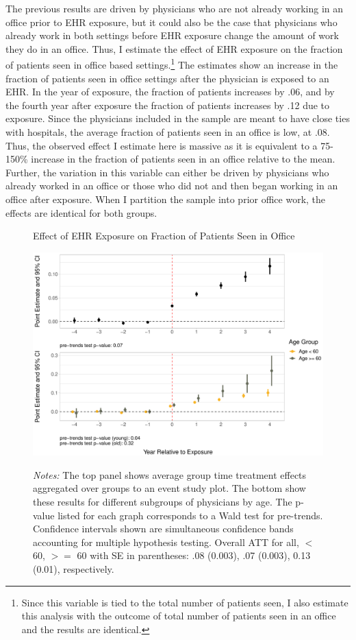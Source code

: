 \documentclass[12pt]{article}
\begin{document}
The previous results are driven by physicians who are not already working in an office prior to EHR exposure, but it could also be the case that physicians who already work in both settings before EHR exposure change the amount of work they do in an office. Thus, I estimate the effect of EHR exposure on the fraction of patients seen in office based settings.\footnote{Since this variable is tied to the total number of patients seen, I also estimate this analysis with the outcome of total number of patients seen in an office and the results are identical.} The estimates show an increase in the fraction of patients seen in office settings after the physician is exposed to an EHR. In the year of exposure, the fraction of patients increases by .06, and by the fourth year after exposure the fraction of patients increases by .12 due to exposure. Since the physicians included in the sample are meant to have close ties with hospitals, the average fraction of patients seen in an office is low, at .08. Thus, the observed effect I estimate here is massive as it is equivalent to a 75-150\% increase in the fraction of patients seen in an office relative to the mean. Further, the variation in this variable can either be driven by physicians who already worked in an office or those who did not and then began working in an office after exposure. When I partition the sample into prior office work, the effects are identical for both groups. 


\begin{figure}[ht]
    \centering
    \captionsetup{width=.85\linewidth}
    \caption{Effect of EHR Exposure on Fraction of Patients Seen in Office}
    \includegraphics[scale=.6]{Objects/officefrac_plot.pdf}
    \label{fig:officesecond}
    \vspace{2mm}
    \caption*{\footnotesize{\textit{Notes:} The top panel shows average group time treatment effects aggregated over groups to an event study plot. The bottom show these results for different subgroups of physicians by age. The p-value listed for each graph corresponds to a Wald test for pre-trends. Confidence intervals shown are simultaneous confidence bands accounting for multiple hypothesis testing. Overall ATT for all, $<$ 60, $>=$ 60 with SE in parentheses: .08 (0.003), .07 (0.003), 0.13 (0.01), respectively.}}
\end{figure}
\end{document}
